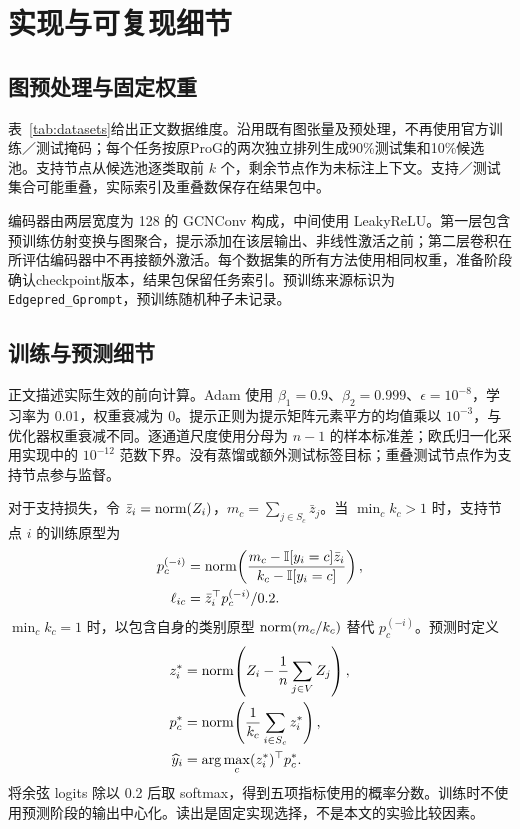 \section{实现与可复现细节}
\label{app:protocol}
\subsection{图预处理与固定权重}
表~\ref{tab:datasets}给出正文数据维度。沿用既有图张量及预处理，不再使用官方训练／测试掩码；每个任务按原ProG的两次独立排列生成90\%测试集和10\%候选池。支持节点从候选池逐类取前 $k$ 个，剩余节点作为未标注上下文。支持／测试集合可能重叠，实际索引及重叠数保存在结果包中。


编码器由两层宽度为 128 的 GCNConv 构成，中间使用 LeakyReLU。第一层包含预训练仿射变换与图聚合，提示添加在该层输出、非线性激活之前；第二层卷积在所评估编码器中不再接额外激活。每个数据集的所有方法使用相同权重，准备阶段确认checkpoint版本，结果包保留任务索引。预训练来源标识为 \texttt{Edgepred\_Gprompt}，预训练随机种子未记录。

\subsection{训练与预测细节}
正文描述实际生效的前向计算。Adam 使用 $\beta_1=0.9$、$\beta_2=0.999$、$\epsilon=10^{-8}$，学习率为 0.01，权重衰减为 0。提示正则为提示矩阵元素平方的均值乘以 $10^{-3}$，与优化器权重衰减不同。逐通道尺度使用分母为 $n-1$ 的样本标准差；欧氏归一化采用实现中的 $10^{-12}$ 范数下界。没有蒸馏或额外测试标签目标；重叠测试节点作为支持节点参与监督。

对于支持损失，令 $\bar z_i=\operatorname{norm}\!\left(Z_i\right)$，$m_c=\sum_{j\in S_c}\bar z_j$。当 $\min_c k_c>1$ 时，支持节点 $i$ 的训练原型为
\begin{equation}
\begin{aligned}
p_c^{(-i)}&=\operatorname{norm}\!\left(\frac{m_c-\mathbb I[y_i=c]\bar z_i}{k_c-\mathbb I[y_i=c]}\right),\\
\ell_{ic}&=\bar z_i^\top p_c^{(-i)}/0.2.
\end{aligned}
\label{eq:loo}
\end{equation}
$\min_c k_c=1$ 时，以包含自身的类别原型 $\operatorname{norm}\!\left(m_c/k_c\right)$ 替代 $p_c^{(-i)}$。预测时定义
\begin{equation}
\begin{aligned}
z_i^*&=\operatorname{norm}\!\left(Z_i-\frac1n\sum_{j\in V}Z_j\right),\\
p_c^*&=\operatorname{norm}\!\left(\frac1{k_c}\sum_{i\in S_c}z_i^*\right),\\
\widehat y_i&=\arg\max_c (z_i^*)^\top p_c^*.
\end{aligned}
\label{eq:predict}
\end{equation}
将余弦 logits 除以 0.2 后取 softmax，得到五项指标使用的概率分数。训练时不使用预测阶段的输出中心化。读出是固定实现选择，不是本文的实验比较因素。

